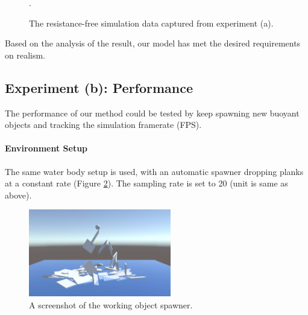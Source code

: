 \begin{figure}[h]
	\centering
	\caption{The resistance-free simulation data captured from experiment (a).}.
	\label{experiment-no-resistance}
\end{figure}

Based on the analysis of the result, our model has met the desired requirements on realism.

\subsection{Experiment (b): Performance}

The performance of our method could be tested by keep spawning new buoyant objects and tracking the simulation framerate (FPS).

\paragraph*{Environment Setup}

The same water body setup is used, with an automatic spawner dropping planks at a constant rate (Figure \ref{spawner-setup}).
The sampling rate is set to 20 (unit is same as above).

\begin{figure}[h]
	\centering
	\includegraphics[height=1.5in]{figures/spawner-setup.jpg}
	\caption{A screenshot of the working object spawner.}
	\label{spawner-setup}
\end{figure}


